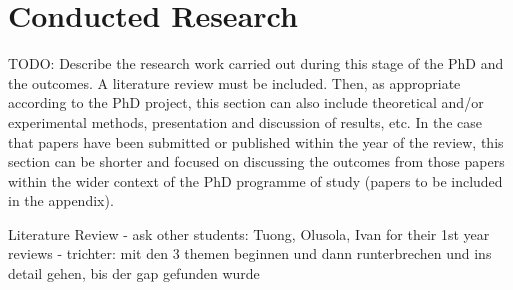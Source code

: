 \section{Conducted Research}
TODO: Describe the research work carried out during this stage of the PhD and the outcomes. A literature review must be included. Then, as appropriate according to the PhD project, this section can also include theoretical and/or experimental methods, presentation and discussion of results, etc. In the case that papers have been submitted or published within the year of the review, this section can be shorter and focused on discussing the outcomes from those papers within the wider context of the PhD programme of study (papers to be included in the appendix).

Literature Review
- ask other students: Tuong, Olusola, Ivan for their 1st year reviews
- trichter: mit den 3 themen beginnen und dann runterbrechen und ins detail gehen, bis der gap gefunden wurde